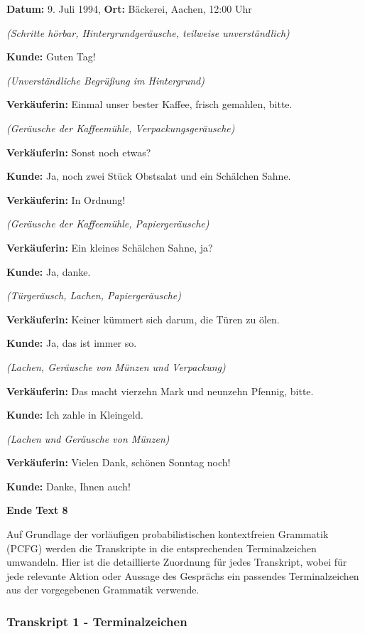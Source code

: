 \documentclass[
]{article}
\begin{document}
\textbf{Datum:} 9. Juli 1994, \textbf{Ort:} Bäckerei, Aachen, 12:00 Uhr

\emph{(Schritte hörbar, Hintergrundgeräusche, teilweise unverständlich)}

\textbf{Kunde:} Guten Tag!

\emph{(Unverständliche Begrüßung im Hintergrund)}

\textbf{Verkäuferin:} Einmal unser bester Kaffee, frisch gemahlen,
bitte.

\emph{(Geräusche der Kaffeemühle, Verpackungsgeräusche)}

\textbf{Verkäuferin:} Sonst noch etwas?

\textbf{Kunde:} Ja, noch zwei Stück Obstsalat und ein Schälchen Sahne.

\textbf{Verkäuferin:} In Ordnung!

\emph{(Geräusche der Kaffeemühle, Papiergeräusche)}

\textbf{Verkäuferin:} Ein kleines Schälchen Sahne, ja?

\textbf{Kunde:} Ja, danke.

\emph{(Türgeräusch, Lachen, Papiergeräusche)}

\textbf{Verkäuferin:} Keiner kümmert sich darum, die Türen zu ölen.

\textbf{Kunde:} Ja, das ist immer so.

\emph{(Lachen, Geräusche von Münzen und Verpackung)}

\textbf{Verkäuferin:} Das macht vierzehn Mark und neunzehn Pfennig,
bitte.

\textbf{Kunde:} Ich zahle in Kleingeld.

\emph{(Lachen und Geräusche von Münzen)}

\textbf{Verkäuferin:} Vielen Dank, schönen Sonntag noch!

\textbf{Kunde:} Danke, Ihnen auch!

\textbf{Ende Text 8}

Auf Grundlage der vorläufigen probabilistischen kontextfreien Grammatik
(PCFG) werden die Transkripte in die entsprechenden Terminalzeichen
umwandeln. Hier ist die detaillierte Zuordnung für jedes Transkript,
wobei für jede relevante Aktion oder Aussage des Gesprächs ein passendes
Terminalzeichen aus der vorgegebenen Grammatik verwende.

\subsubsection{\texorpdfstring{\textbf{Transkript 1 -
Terminalzeichen}}{Transkript 1 - Terminalzeichen}}\label{transkript-1---terminalzeichen}
\end{document}
